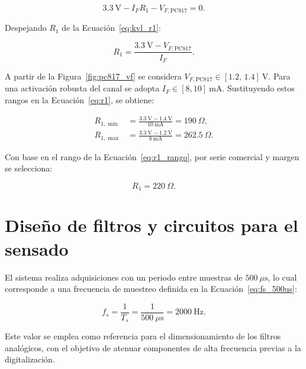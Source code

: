 \begin{equation}
3.3~\mathrm{V} - I_F R_1 - V_{F,\text{PC817}} = 0.
\label{eq:kvl_r1}
\end{equation}

Despejando \(R_1\) de la Ecuación~\ref{eq:kvl_r1}:

\begin{equation}
R_1=\frac{3.3~\mathrm{V}-V_{F,\text{PC817}}}{I_F}.
\label{eq:r1}
\end{equation}

A partir de la Figura~\ref{fig:pc817_vf} se considera \(V_{F,\text{PC817}}\in[1.2,\,1.4]~\mathrm{V}\). Para una activación robusta del canal se adopta \(I_F\in[8,10]~\mathrm{mA}\). Sustituyendo estos rangos en la Ecuación~\ref{eq:r1}, se obtiene:

\begin{align}
R_{1,\min} &= \frac{3.3~\mathrm{V}-1.4~\mathrm{V}}{10~\mathrm{mA}} = 190~\Omega, \\
R_{1,\max} &= \frac{3.3~\mathrm{V}-1.2~\mathrm{V}}{8~\mathrm{mA}} = 262.5~\Omega.
\label{eq:r1_rango}
\end{align}

Con base en el rango de la Ecuación~\ref{eq:r1_rango}, por serie comercial y margen se selecciona:

\begin{equation}
R_1=220~\Omega.
\label{eq:r1_sel}
\end{equation}


\section{Diseño de filtros y circuitos para el sensado}
\label{sec:diseno_filtros_sensado}

El sistema realiza adquisiciones con un periodo entre muestras de \(500~\mu\mathrm{s}\), lo cual corresponde a una frecuencia de muestreo definida en la Ecuación~\ref{eq:fs_500us}:

\begin{equation}
f_s=\frac{1}{T_s}=\frac{1}{500~\mu\mathrm{s}}=2000~\mathrm{Hz}.
\label{eq:fs_500us}
\end{equation}

Este valor se emplea como referencia para el dimensionamiento de los filtros analógicos, con el objetivo de atenuar componentes de alta frecuencia previas a la digitalización.

